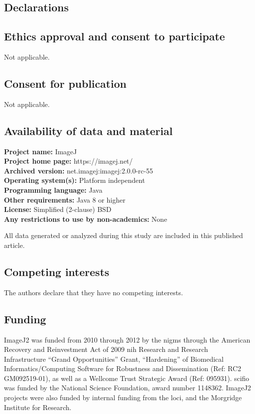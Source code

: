 \documentclass{bmcart}
\begin{document}
\begin{backmatter}

\section*{Declarations}

\subsection*{Ethics approval and consent to participate}
Not applicable.

\subsection*{Consent for publication}
Not applicable.

\subsection*{Availability of data and material}

\textbf{Project name:} ImageJ\\
\textbf{Project home page:} https://imagej.net/\\
\textbf{Archived version:} net.imagej:imagej:2.0.0-rc-55\\
\textbf{Operating system(s):} Platform independent\\
\textbf{Programming language:} Java\\
\textbf{Other requirements:} Java 8 or higher\\
\textbf{License:} Simplified (2-clause) BSD\\
\textbf{Any restrictions to use by non-academics:} None

All data generated or analyzed during this study are included in this
published article.

\subsection*{Competing interests}
  The authors declare that they have no competing interests.

\subsection*{Funding}
  ImageJ2 was funded from 2010 through 2012 by the \acrfull{nigms} through the
  American Recovery and Reinvestment Act of 2009 \acrshort{nih} Research and
  Research Infrastructure ``Grand Opportunities'' Grant, ``Hardening'' of
  Biomedical Informatics/Computing Software for Robustness and Dissemination
  (Ref: RC2 GM092519-01), as well as a Wellcome Trust Strategic Award (Ref:
  095931). \acrshort{scifio} was funded by the National Science Foundation,
  award number 1148362. ImageJ2 projects were also funded by internal funding
  from the \acrlong{loci}, and the Morgridge Institute for Research.


\end{backmatter}
\end{document}
